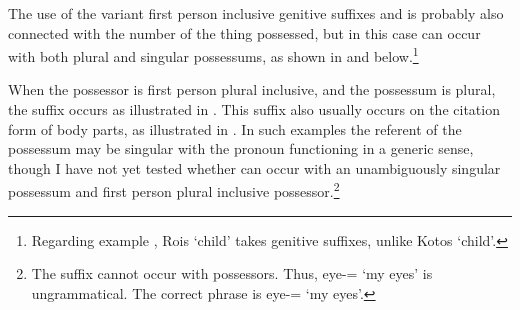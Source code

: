 The use of the variant first person inclusive genitive suffixes
 and  is probably also connected with the number of the
thing possessed, but in this case  can occur with both
plural and singular possessums, as shown in 
and  below.\footnote{
		Regarding example ,
		Ro{\Q}is  `child' takes genitive suffixes,
		unlike Kotos  `child'.}

\begin{exe}
	\label{ex:RO-170829-1, 0.51}
	\label{ex:obs. 01/09/17, p.29}
\end{exe}

When the possessor is first person plural inclusive,
and the possessum is plural, the suffix  occurs
as illustrated in .
This suffix also usually occurs on the citation form of
body parts, as illustrated in .
In such examples the referent of the possessum may be singular
with the pronoun  functioning in a generic sense,
though I have not yet tested whether  can occur
with an unambiguously singular possessum and first person plural inclusive possessor.\footnote{
		The suffix  cannot occur with  possessors.
		Thus,  {\au} eye-={\ein} `my eyes' is ungrammatical.
		The correct phrase is  {\au} eye-={\ein} `my eyes'.}

\begin{exe}
	\label{ex:elicit. 31/08/17, p.28}
	\label{ex:elicit. 170819-1, 2.51}
\end{exe}


